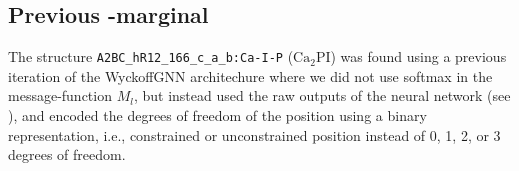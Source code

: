 \subsection{Previous \ourmodel-marginal}
\label{app:previous-marginal-model}

The structure \texttt{A2BC\_hR12\_166\_c\_a\_b:Ca-I-P} ($\mathrm{Ca_2PI}$) was found using a previous iteration of the WyckoffGNN architechure where we did not use softmax in the message-function $M_l$, but instead used the raw outputs of the neural network (see ), and encoded the degrees of freedom of the position using a binary representation, i.e., constrained or unconstrained position instead of 0, 1, 2, or 3 degrees of freedom.




